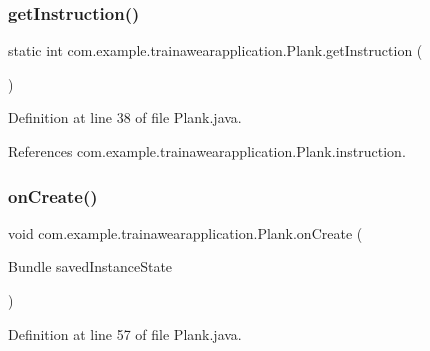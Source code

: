 \subsubsection{\texorpdfstring{getInstruction()}{getInstruction()}}
{\footnotesize\ttfamily static int com.\+example.\+trainawearapplication.\+Plank.\+get\+Instruction (\begin{DoxyParamCaption}{ }\end{DoxyParamCaption})\hspace{0.3cm}{\ttfamily [static]}}



Definition at line 38 of file Plank.\+java.


\begin{DoxyCode}{0}

\end{DoxyCode}


References com.\+example.\+trainawearapplication.\+Plank.\+instruction.

\mbox{\label{classcom_1_1example_1_1trainawearapplication_1_1_plank_a8071af6c71d817914e58bd99b92c0904}} 
\subsubsection{\texorpdfstring{onCreate()}{onCreate()}}
{\footnotesize\ttfamily void com.\+example.\+trainawearapplication.\+Plank.\+on\+Create (\begin{DoxyParamCaption}\item[{Bundle}]{saved\+Instance\+State }\end{DoxyParamCaption})\hspace{0.3cm}{\ttfamily [protected]}}



Definition at line 57 of file Plank.\+java.


